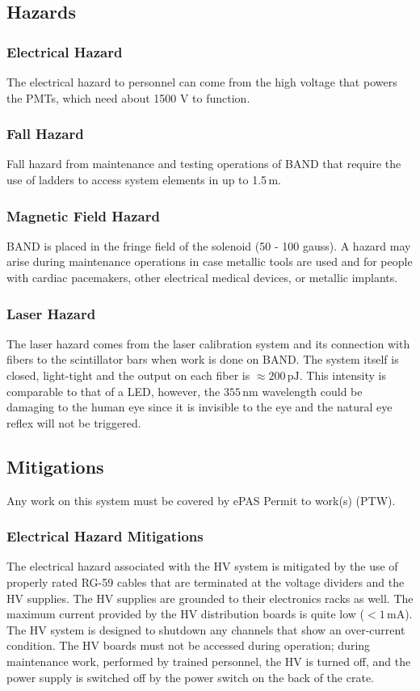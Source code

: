 \subsection{Hazards} 
\indent
\subsubsection{Electrical Hazard}
The electrical hazard to personnel can come from the high voltage that powers the PMTs, which need
about 1500 V to function. 

\subsubsection{Fall Hazard}
Fall hazard from maintenance and testing operations of BAND that require the use of ladders to access
system elements in up to 1.5\,m. 

\subsubsection{Magnetic Field Hazard}
BAND is placed in the fringe field of the solenoid (50 - 100 gauss). A hazard may arise during maintenance
operations in case metallic tools are used and for people with cardiac pacemakers, other electrical medical
devices, or metallic implants.

\subsubsection{Laser Hazard}
The laser hazard comes from the laser calibration system and its connection with fibers to the scintillator
bars when work is done on BAND. The system itself is closed, light-tight and the output on each fiber is
$\approx 200\,\mathrm{pJ}$. This intensity is comparable to that of a LED, however, the $355\,\mathrm{nm}$
wavelength could be damaging to the human eye since it is invisible to the eye and the natural eye reflex
will not be triggered. 

\subsection{Mitigations}
Any work on this system must be covered by ePAS Permit to work(s) (PTW).

\indent
\subsubsection{Electrical Hazard Mitigations} 
The electrical hazard associated with the HV system is mitigated by the use of properly rated RG-59 cables
that are terminated at the voltage dividers and the HV supplies.
The HV supplies are grounded to their electronics racks as well. 
The maximum current provided by the HV distribution boards is quite low ($<1\,\mathrm{mA}$). The HV system
is designed to shutdown any channels that show an over-current condition. The HV boards must not be accessed
during operation; during maintenance work, performed by trained personnel, the HV is turned off, and the
power supply is switched off by the power switch on the back of the crate.

